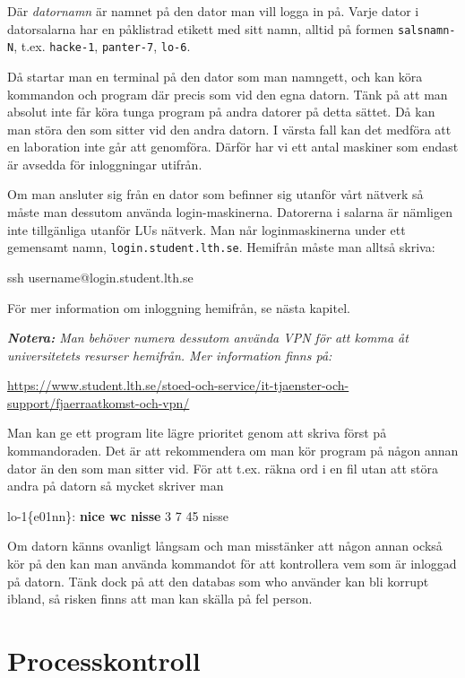 \documentclass[a4paper,twocolumn]{book}
\begin{document}
Där \emph{datornamn} är namnet på den dator man vill logga in på. Varje dator i 
datorsalarna har en påklistrad etikett med sitt namn, alltid på formen 
\texttt{salsnamn-N}, t.ex. \texttt{hacke-1}, \texttt{panter-7}, \texttt{lo-6}.

Då startar man en terminal på den dator som man namngett, och kan köra
kommandon och program där precis som vid den egna datorn.
Tänk på att man absolut inte får köra tunga program på andra datorer
på detta sättet. Då kan man störa den som sitter vid den andra datorn.
I värsta fall kan det medföra att en laboration inte går att
genomföra. Därför har vi ett antal maskiner
som endast är avsedda för inloggningar utifrån.

Om man ansluter sig från en dator som befinner sig utanför vårt nätverk så
måste man dessutom använda login-maskinerna. Datorerna i salarna är nämligen
inte tillgänliga utanför LUs nätverk. Man når loginmaskinerna under ett gemensamt namn,
\texttt{login.student.lth.se}.
Hemifrån måste man alltså skriva:
\begin{ttquote}
  ssh username@login.student.lth.se
\end{ttquote}
För mer information om inloggning hemifrån, se nästa kapitel.


\emph{\textbf{Notera:} Man behöver numera dessutom använda VPN för att komma åt 
universitetets resurser hemifrån. Mer information finns på:}

\url{https://www.student.lth.se/stoed-och-service/it-tjaenster-och-support/fjaerraatkomst-och-vpn/}

Man kan ge ett program lite lägre prioritet genom att skriva
 först på kommandoraden. Det är att rekommendera om man
kör program på någon annan dator än den som man sitter
vid. För att t.ex. räkna ord i en fil utan att störa andra på datorn så
mycket skriver man
\begin{example}
  lo-1\{e01nn\}: \textbf{nice wc nisse}
  3       7      45 nisse
\end{example}

Om datorn känns ovanligt långsam och man misstänker att någon annan
också kör på den kan man använda kommandot  för att
kontrollera vem som är inloggad på datorn. Tänk dock på att den
databas som who använder kan bli korrupt ibland, så risken finns att
man kan skälla på fel person.

\section{Processkontroll}
\end{document}
